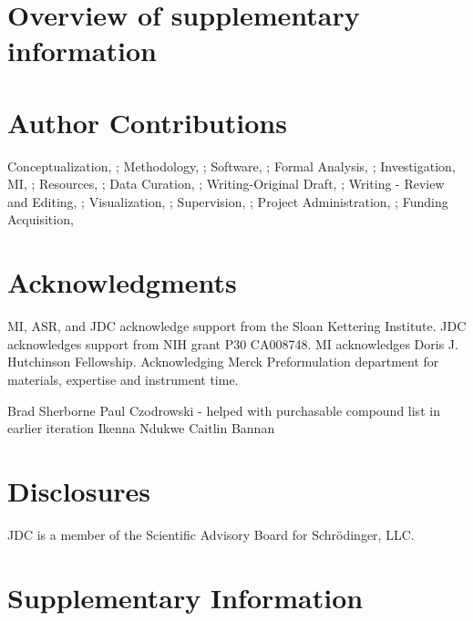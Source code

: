 \documentclass[9pt,lineno]{elife}
\begin{document}
\section{Overview of supplementary information}

\section{Author Contributions}

Conceptualization, ; Methodology, ; Software, ; Formal Analysis, ; Investigation, MI, ; Resources, ;  Data Curation, ; Writing-Original Draft, ; Writing - Review and Editing, ; Visualization, ; Supervision, ; Project Administration, ; Funding Acquisition, 


\section{Acknowledgments}

MI, ASR, and JDC acknowledge support from the Sloan Kettering Institute. JDC acknowledges support from NIH grant P30 CA008748. MI acknowledges Doris J. Hutchinson Fellowship. Acknowledging Merck Preformulation department for materials, expertise and instrument time.

Brad Sherborne  
Paul Czodrowski - helped with purchasable compound list in earlier iteration  
Ikenna Ndukwe  
Caitlin Bannan  

\section{Disclosures}

JDC is a member of the Scientific Advisory Board for Schr\"{o}dinger, LLC.

\nocite{*} %


\newpage
\section{Supplementary Information}
\end{document}
